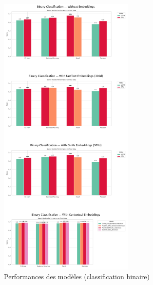 \documentclass[12pt]{report}
\begin{document}
\begin{figure}[H]
\centering
\includegraphics[width=0.6\textwidth]{model_performances_binary.png}
\caption{Performances des modèles (classification binaire)}
\label{fig:model_performances_binary}
\end{figure}
\end{document}
